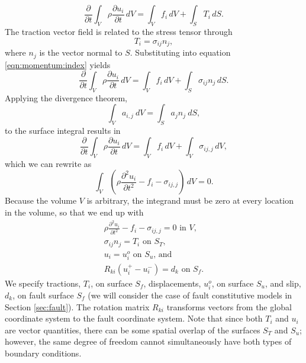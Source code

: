\begin{equation}
\frac{\partial}{\partial t}\int_{V}\rho\frac{\partial u_{i}}{\partial t}\, dV=\int_{V}f_{i}\, dV+\int_{S}T_{i}\, dS.\label{eqn:momentum:index}
\end{equation}
The traction vector field is related to the stress tensor through
\begin{equation}
T_{i}=\sigma_{ij}n_{j},
\end{equation}
where $n_{j}$ is the vector normal to $S$. Substituting into equation
\vref{eqn:momentum:index} yields
\begin{equation}
\frac{\partial}{\partial t}\int_{V}\rho\frac{\partial u_{i}}{\partial t}\, dV=\int_{V}f_{i}\, dV+\int_{S}\sigma_{ij}n_{j}\, dS.
\end{equation}
Applying the divergence theorem,
\begin{equation}
\int_{V}a_{i,j}\: dV=\int_{S}a_{j}n_{j}\: dS,
\end{equation}
to the surface integral results in
\begin{equation}
\frac{\partial}{\partial t}\int_{V}\rho\frac{\partial u_{i}}{\partial t}\, dV=\int_{V}f_{i}\, dV+\int_{V}\sigma_{ij,j}\, dV,
\end{equation}
which we can rewrite as
\begin{equation}
\int_{V}\left(\rho\frac{\partial^{2}u_{i}}{\partial t^{2}}-f_{i}-\sigma_{ij,j}\right)\, dV=0.
\end{equation}
Because the volume $V$ is arbitrary, the integrand must be zero at
every location in the volume, so that we end up with
\begin{gather}
\rho\frac{\partial^{2}u_{i}}{\partial t^{2}}-f_{i}-\sigma_{ij,j}=0\text{ in }V,\\
\sigma_{ij}n_{j}=T_{i}\text{ on }S_{T}\text{,}\\
u_{i}=u_{i}^{o}\text{ on }S_{u}\text{, and}\\
R_{ki}(u_{i}^{+}-u_{i}^{-})=d_{k}\text{ on }S_{f}.
\end{gather}
We specify tractions, $T_{i}$, on surface $S_{f}$, displacements,
$u_{i}^{o}$, on surface $S_{u}$, and slip, $d_{k}$, on fault surface
$S_{f}$ (we will consider the case of fault constitutive models in
Section \vref{sec:fault}). The rotation matrix $R_{ki}$ transforms
vectors from the global coordinate system to the fault coordinate
system. Note that since both $T_{i}$ and $u_{i}$ are vector quantities,
there can be some spatial overlap of the surfaces $S_{T}$ and $S_{u}$;
however, the same degree of freedom cannot simultaneously have both
types of boundary conditions.


